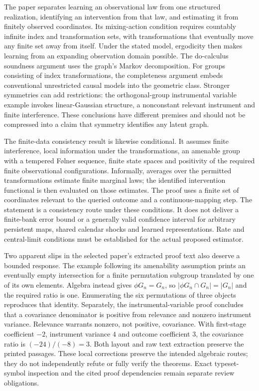 The paper separates learning an observational law from one structured
realization, identifying an intervention from that law, and estimating it
from finitely observed coordinates. Its mixing-action condition requires
countably infinite index and transformation sets, with transformations that
eventually move any finite set away from itself. Under the stated model,
ergodicity then makes learning from an expanding observation domain possible.
The do-calculus soundness argument uses the graph's Markov decomposition.
For groups consisting of index transformations, the completeness argument
embeds conventional unrestricted causal models into the geometric class.
Stronger symmetries can add restrictions: the orthogonal-group instrumental
variable example invokes linear-Gaussian structure, a nonconstant relevant
instrument and finite interference. These conclusions have different
premises and should not be compressed into a claim that symmetry identifies
any latent graph.
\citep{exec23_geometric_models}

The finite-data consistency result is likewise conditional. It assumes
finite interference, local information under the transformations, an
amenable group with a tempered F{\o}lner sequence, finite state spaces and
positivity of the required finite observational configurations. Informally,
averages over the permitted transformations estimate finite marginal laws;
the identified intervention functional is then evaluated on those estimates.
The proof uses a finite set of coordinates relevant to the queried outcome
and a continuous-mapping step. The statement is a consistency route under
these conditions. It does not deliver a finite-bank error bound or a
generally valid confidence interval for arbitrary persistent maps, shared
calendar shocks and learned representations. Rate and central-limit
conditions must be established for the actual proposed estimator.
\citep{exec23_geometric_models}

Two apparent slips in the selected paper's extracted proof text also deserve
a bounded response. The example following its amenability assumption prints
an eventually empty intersection for a finite permutation subgroup translated
by one of its own elements. Algebra instead gives $\phi G_n=G_n$, so
$|\phi G_n\cap G_n|=|G_n|$ and the required ratio is one. Enumerating
the six permutations of three objects reproduces that identity. Separately,
the instrumental-variable proof concludes that a covariance denominator is
positive from relevance and nonzero instrument variance. Relevance warrants
nonzero, not positive, covariance. With first-stage coefficient $-2$,
instrument variance $4$ and outcome coefficient $3$, the covariance ratio
is $(-24)/(-8)=3$. Both layout and raw text extraction preserve the printed
passages. These local corrections preserve the intended algebraic routes;
they do not independently refute or fully verify the theorems. Exact
typeset-symbol inspection and the cited proof dependencies remain separate
review obligations.
\citep{exec23_geometric_models,exec23_structured_reference}

